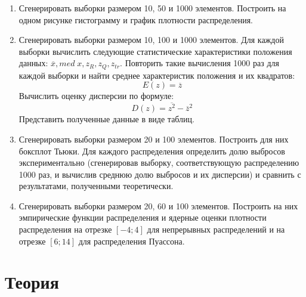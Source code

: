 \documentclass[12pt,a4paper]{article}
\begin{document}
	\begin{enumerate}
		\item Сгенерировать выборки размером 10, 50 и 1000 элементов. Построить на одном рисунке гистограмму и график плотности распределения.
		
		\item Сгенерировать выборки размером 10, 100 и 1000 элементов. Для каждой выборки вычислить следующие статистические характеристики положения данных: $\overline{x}, med\;x, z_R, z_Q, z_{tr}$. Повторить такие вычисления 1000 раз для каждой выборки и найти среднее характеристик положения и их квадратов:
		\begin{equation}\label{eqn:expected_value}
		E(z)=\overline{z}
		\end{equation}
		Вычислить оценку дисперсии по формуле:
		\begin{equation}\label{eqn:variance}
		D(z)=\overline{z^2}-\overline{z}^2
		\end{equation}
		Представить полученные данные в виде таблиц.
		
		\item Сгенерировать выборки размером 20 и 100 элементов. Построить для них боксплот Тьюки. Для каждого распределения определить долю выбросов экспериментально (сгенерировав выборку, соответствующую распределению 1000 раз, и вычислив среднюю долю выбросов и их дисперсии) и сравнить с результатами, полученными теоретически.
		
		\item Сгенерировать выборки размером 20, 60 и 100 элементов. Построить на них эмпирические функции распределения и ядерные оценки плотности распределения на отрезке $[-4;4]$ для непрерывных распределений и на отрезке $[6;14]$ для распределения Пуассона.
	\end{enumerate}
	
\section{Теория}
\end{document}
